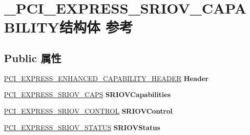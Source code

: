 \hypertarget{struct___p_c_i___e_x_p_r_e_s_s___s_r_i_o_v___c_a_p_a_b_i_l_i_t_y}{}\section{\+\_\+\+P\+C\+I\+\_\+\+E\+X\+P\+R\+E\+S\+S\+\_\+\+S\+R\+I\+O\+V\+\_\+\+C\+A\+P\+A\+B\+I\+L\+I\+T\+Y结构体 参考}
\label{struct___p_c_i___e_x_p_r_e_s_s___s_r_i_o_v___c_a_p_a_b_i_l_i_t_y}
\subsection*{Public 属性}
\begin{DoxyCompactItemize}
\item 
\mbox{\label{struct___p_c_i___e_x_p_r_e_s_s___s_r_i_o_v___c_a_p_a_b_i_l_i_t_y_a9e9cfb44f7f9cfa7b92527458829c3b0}} 
\hyperlink{struct___p_c_i___e_x_p_r_e_s_s___e_n_h_a_n_c_e_d___c_a_p_a_b_i_l_i_t_y___h_e_a_d_e_r}{P\+C\+I\+\_\+\+E\+X\+P\+R\+E\+S\+S\+\_\+\+E\+N\+H\+A\+N\+C\+E\+D\+\_\+\+C\+A\+P\+A\+B\+I\+L\+I\+T\+Y\+\_\+\+H\+E\+A\+D\+ER} {\bfseries Header}
\item 
\mbox{\label{struct___p_c_i___e_x_p_r_e_s_s___s_r_i_o_v___c_a_p_a_b_i_l_i_t_y_a59bff9862838a0ddd9858742a942a0bb}} 
\hyperlink{union___p_c_i___e_x_p_r_e_s_s___s_r_i_o_v___c_a_p_s}{P\+C\+I\+\_\+\+E\+X\+P\+R\+E\+S\+S\+\_\+\+S\+R\+I\+O\+V\+\_\+\+C\+A\+PS} {\bfseries S\+R\+I\+O\+V\+Capabilities}
\item 
\mbox{\label{struct___p_c_i___e_x_p_r_e_s_s___s_r_i_o_v___c_a_p_a_b_i_l_i_t_y_aa61148f691aa6b546feadb07ba7810e9}} 
\hyperlink{union___p_c_i___e_x_p_r_e_s_s___s_r_i_o_v___c_o_n_t_r_o_l}{P\+C\+I\+\_\+\+E\+X\+P\+R\+E\+S\+S\+\_\+\+S\+R\+I\+O\+V\+\_\+\+C\+O\+N\+T\+R\+OL} {\bfseries S\+R\+I\+O\+V\+Control}
\item 
\mbox{\label{struct___p_c_i___e_x_p_r_e_s_s___s_r_i_o_v___c_a_p_a_b_i_l_i_t_y_a91dd2a5baf52d6fda033d4eef39bacd6}} 
\hyperlink{union___p_c_i___e_x_p_r_e_s_s___s_r_i_o_v___s_t_a_t_u_s}{P\+C\+I\+\_\+\+E\+X\+P\+R\+E\+S\+S\+\_\+\+S\+R\+I\+O\+V\+\_\+\+S\+T\+A\+T\+US} {\bfseries S\+R\+I\+O\+V\+Status}

\end{DoxyCompactItemize}
